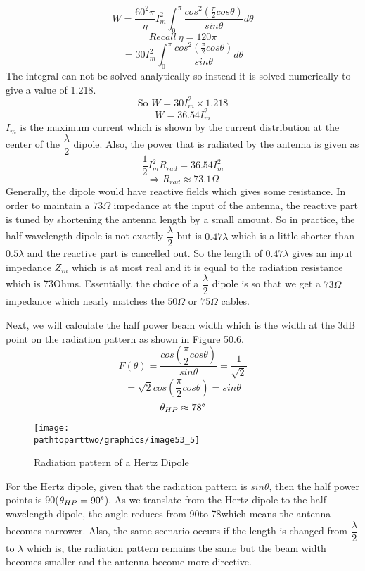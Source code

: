 \[ W = \frac{60^2\pi}{\eta} I_m^2 \int_{0}^{\pi} \frac{cos^2(\frac{\pi}{2}cos\theta)}{sin\theta}d\theta \]
\[Recall\ \eta = 120\pi \]
\[ = 30I_m^2 \int_{0}^{\pi}\dfrac{cos^2(\frac{\pi}{2}cos\theta)}{sin\theta}d\theta \]
The integral can not be solved analytically so instead it is solved numerically to give a value of 1.218.
\[ \text{So } W = 30I_m^2 \times 1.218 \]
\begin{equation}
W = 36.54I_m^2
\end{equation}
$I_m$ is the maximum current which is shown by the current distribution at the center of the $\dfrac{\lambda}{2}$ dipole.
Also, the power that is radiated by the antenna is given as $$\dfrac{1}{2}I_m^2 R_{rad} = 36.54I_m^2$$
\[ \Rightarrow R_{rad} \approx 73.1\Omega \]
Generally, the dipole would have reactive fields which gives some resistance. In order to maintain a $73\Omega$ impedance at the input of the antenna, the reactive part is tuned by shortening the antenna length by a small amount. So in practice, the half-wavelength dipole is not exactly $\dfrac{\lambda}{2}$ but is $0.47\lambda$ which is a little shorter than $0.5\lambda$ and the reactive part is cancelled out. So the length of $0.47\lambda$ gives an input impedance $Z_{in}$ which is at most real and it is equal to the radiation resistance which is 73Ohms. Essentially, the choice of a $\dfrac{\lambda}{2}$ dipole is so that we get a $73\Omega$ impedance which nearly matches the $50\Omega$ or $75\Omega$ cables.

Next, we will calculate the half power beam width which is the width at the 3dB point on the radiation pattern as shown in Figure 50.6.
\[ F(\theta) = \dfrac{cos(\dfrac{\pi}{2}cos\theta)}{sin\theta} = \dfrac{1}{\sqrt{2}} \]
\[ = \sqrt{2}cos(\dfrac{\pi}{2}cos\theta) = sin\theta \]
\[ \theta_{HP} \approx 78\text{\textdegree} \]
\begin{figure}[h]
\centering
\texttt{[image: \\pathtoparttwo/graphics/image53\_5]}
\caption{Radiation pattern of a Hertz Dipole}
\label{fig:fig5}
\end{figure}

For the Hertz dipole, given that the radiation pattern is $sin\theta$, then the half power points is 90\textdegree($\theta_{HP} = 90\text{\textdegree}$). As we translate from the Hertz dipole to the half-wavelength dipole, the angle reduces from 90\textdegree to 78\textdegree  which means the antenna becomes narrower. Also, the same scenario occurs if the length is changed from $\dfrac{\lambda}{2}$ to $\lambda$ which is, the radiation pattern remains the same but the beam width becomes smaller and the antenna become more directive.


